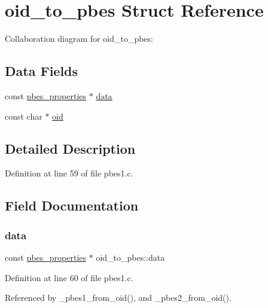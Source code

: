 \hypertarget{structoid__to__pbes}{}\section{oid\+\_\+to\+\_\+pbes Struct Reference}
\label{structoid__to__pbes}


Collaboration diagram for oid\+\_\+to\+\_\+pbes\+:
\subsection*{Data Fields}
\begin{DoxyCompactItemize}
\item 
const \mbox{\hyperlink{structpbes__properties}{pbes\+\_\+properties}} $\ast$ \mbox{\hyperlink{structoid__to__pbes_aed151510a90a7d1f78c630d858a54f65}{data}}
\item 
const char $\ast$ \mbox{\hyperlink{structoid__to__pbes_a4140b471b529160b9c48318e99b30b40}{oid}}
\end{DoxyCompactItemize}


\subsection{Detailed Description}


Definition at line 59 of file pbes1.\+c.



\subsection{Field Documentation}
\mbox{\label{structoid__to__pbes_aed151510a90a7d1f78c630d858a54f65}} 
\subsubsection{\texorpdfstring{data}{data}}
{\footnotesize\ttfamily const \mbox{\hyperlink{structpbes__properties}{pbes\+\_\+properties}} $\ast$ oid\+\_\+to\+\_\+pbes\+::data}



Definition at line 60 of file pbes1.\+c.



Referenced by \+\_\+pbes1\+\_\+from\+\_\+oid(), and \+\_\+pbes2\+\_\+from\+\_\+oid().

\mbox{\label{structoid__to__pbes_a4140b471b529160b9c48318e99b30b40}} 
